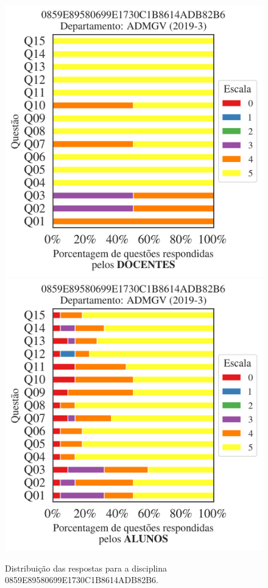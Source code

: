 \documentclass[a4paper,10pt]{article}
\begin{document}
\begin{figure}[h]
\centering
\includegraphics[width=0.485\linewidth]{analise_disciplina_departamento_ADMGV_0859E89580699E1730C1B8614ADB82B6_docentes.png}
\includegraphics[width=0.485\linewidth]{analise_disciplina_departamento_ADMGV_0859E89580699E1730C1B8614ADB82B6_alunos.png}
\caption{\label{fig:analise_geral_departamento}                Distribuição das respostas para a disciplina 0859E89580699E1730C1B8614ADB82B6. }
\end{figure}
\end{document}
